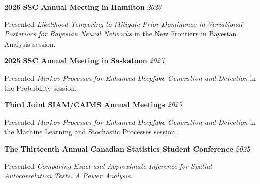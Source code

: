 \vspace*{10pt}

\vspace{8pt}
\noindent
\textbf{2026 SSC Annual Meeting in Hamilton}
\hfill \textit{2026}\par
\vspace{3pt}
\noindent
Presented \textit{Likelihood Tempering to Mitigate Prior Dominance
in Variational Posteriors for Bayesian Neural Networks}
in the New Frontiers in Bayesian Analysis session.\par

\vspace{10pt}
\noindent
\textbf{2025 SSC Annual Meeting in Saskatoon}
\hfill \textit{2025}\par
\vspace{3pt}
\noindent
Presented \textit{Markov Processes for Enhanced Deepfake Generation
and Detection} in the Probability session.\par

\vspace{10pt}
\noindent
\textbf{Third Joint SIAM/CAIMS Annual Meetings}
\hfill \textit{2025}\par
\vspace{3pt}
\noindent
Presented \textit{Markov Processes for Enhanced Deepfake Generation
and Detection} in the Machine Learning and Stochastic Processes
session.\par


\vspace{8pt}
\noindent
\textbf{The Thirteenth Annual Canadian Statistics Student Conference}
\hfill \textit{2025}\par
\vspace{3pt}
\noindent
Presented \textit{Comparing Exact and Approximate Inference for
Spatial Autocorrelation Tests: A Power Analysis}.\par